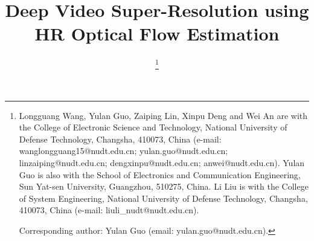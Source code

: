 \documentclass[journal]{IEEEtran}
\begin{document}
\title{Deep Video Super-Resolution using HR Optical Flow Estimation}
	


	\author{
\thanks{
Longguang Wang, Yulan Guo, Zaiping Lin, Xinpu Deng and Wei An are with the College of Electronic Science and Technology, National University of Defense Technology, Changsha, 410073, China (e-mail: wanglongguang15@nudt.edu.cn; yulan.guo@nudt.edu.cn;  linzaiping@nudt.edu.cn; dengxinpu@nudt.edu.cn; anwei@nudt.edu.cn). Yulan Guo is also with the School of Electronics and Communication Engineering, Sun Yat-sen University, Guangzhou, 510275, China.
			Li Liu is with the College of System Engineering, National University of Defense Technology, Changsha, 410073, China (e-mail: 
			liuli\_nudt@nudt.edu.cn).\par
			Corresponding author: Yulan Guo (email: yulan.guo@nudt.edu.cn).}}
	
	
	
	
	
	
\maketitle
	
\end{document}
